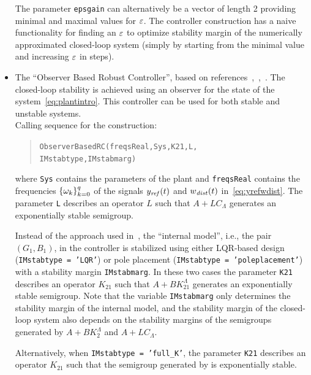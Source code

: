\documentclass[11pt, a4paper]{amsart}
\renewcommand{\pmat}[1]{\begin{bmatrix}#1\end{bmatrix}}
\newcommand{\CL}{C_\Lambda}
\theoremstyle{definition}
\numberwithin{equation}{section}
\newcommand{\yref}{y_{\mbox{\scriptsize\textit{ref}}}}
\newcommand{\wdist}{w_{\mbox{\scriptsize\textit{dist}}}}
\begin{document}
\begin{itemize}
     The parameter \texttt{epsgain} can alternatively be a vector of length 2 providing minimal and maximal values for $\varepsilon$. The controller construction has a naive functionality for finding an $\varepsilon$ to optimize stability margin of the numerically approximated closed-loop system (simply by starting from the minimal value and increasing $\varepsilon$ in steps). 

     \bigskip

  \item The ``Observer Based Robust Controller'', based on references~,~,~. The closed-loop stability is achieved using an observer for the state of the system~\eqref{eq:plantintro}. This controller can be used for both stable and unstable systems.\\[1ex]
      Calling sequence for the construction:\\[-1ex]
     \begin{quotation}
       \texttt{ObserverBasedRC(freqsReal,Sys,K21,L,\\ 
	 \phantom{a}\hspace{2.9cm} IMstabtype,IMstabmarg)}
     \end{quotation}
     \medskip
     where \texttt{Sys} contains the parameters of the plant and \texttt{freqsReal} contains the frequencies $\{\omega_k\}_{k=0}^q$ of the signals $\yref(t)$ and $\wdist(t)$ in~\eqref{eq:yrefwdist}.
     The parameter \texttt{L} describes an operator $L$ such that  $A+L\CL$ generates an exponentially stable semigroup. 

     Instead of the approach used in~\cite{Pau16a}, the ``internal model'', i.e., the pair $(G_1,B_1)$, in the controller is stabilized using either LQR-based design (\texttt{IMstabtype = 'LQR'}) or pole placement (\texttt{IMstabtype = 'poleplacement'}) with a stability margin \texttt{IMstabmarg}.
In these two cases the parameter 
 \texttt{K21} describes an operator $K_{21}$  such that $A+BK_{21}^\Lambda$ generates an exponentially stable semigroup. 
 Note that the variable \texttt{IMstabmarg} only determines the stability margin of the internal model, and the stability margin of the closed-loop system also depends on the stability margins of the semigroups generated by $A+BK_2^\Lambda$ and $A+L\CL$.

Alternatively, when \texttt{IMstabtype = 'full\_K'}, the parameter \texttt{K21} describes an operator $K_{21}$ such that the semigroup generated by
\eq{
\pmat{G_1&G_2\CL\\0&A}+\pmat{G_2D\\B}K_{21}^\Lambda
}
is exponentially stable.
     

\end{itemize}
\end{document}
